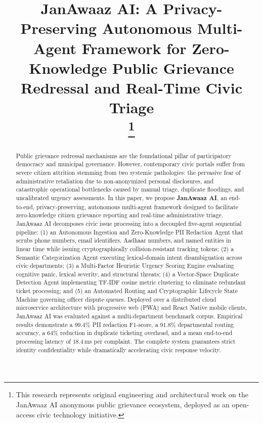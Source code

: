 \documentclass[conference]{IEEEtran}
\begin{document}
\title{JanAwaaz AI: A Privacy-Preserving Autonomous Multi-Agent Framework for Zero-Knowledge Public Grievance Redressal and Real-Time Civic Triage\\
\thanks{This research represents original engineering and architectural work on the JanAwaaz AI anonymous public grievance ecosystem, deployed as an open-access civic technology initiative.}
}

\author{
}

\maketitle

\begin{abstract}
Public grievance redressal mechanisms are the foundational pillar of participatory democracy and municipal governance. However, contemporary civic portals suffer from severe citizen attrition stemming from two systemic pathologies: the pervasive fear of administrative retaliation due to non-anonymized personal disclosures, and catastrophic operational bottlenecks caused by manual triage, duplicate floodings, and uncalibrated urgency assessments. In this paper, we propose \textbf{JanAwaaz AI}, an end-to-end, privacy-preserving, autonomous multi-agent framework designed to facilitate zero-knowledge citizen grievance reporting and real-time administrative triage. JanAwaaz AI decomposes civic issue processing into a decoupled five-agent sequential pipeline: (1) an Autonomous Ingestion and Zero-Knowledge PII Redaction Agent that scrubs phone numbers, email identifiers, Aadhaar numbers, and named entities in linear time while issuing cryptographically collision-resistant tracking tokens; (2) a Semantic Categorization Agent executing lexical-domain intent disambiguation across civic departments; (3) a Multi-Factor Heuristic Urgency Scoring Engine evaluating cognitive panic, lexical severity, and structural threats; (4) a Vector-Space Duplicate Detection Agent implementing TF-IDF cosine metric clustering to eliminate redundant ticket processing; and (5) an Automated Routing and Cryptographic Lifecycle State Machine governing officer dispute queues. Deployed over a distributed cloud microservice architecture with progressive web (PWA) and React Native mobile clients, JanAwaaz AI was evaluated against a multi-department benchmark corpus. Empirical results demonstrate a 99.4\% PII redaction F1-score, a 91.8\% departmental routing accuracy, a 64\% reduction in duplicate ticketing overhead, and a mean end-to-end processing latency of 18.4\,ms per complaint. The complete system guarantees strict identity confidentiality while dramatically accelerating civic response velocity.
\end{abstract}
\end{document}
